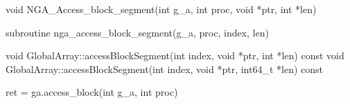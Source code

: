 \documentclass[10pt]{article}
\begin{document}

\begin{capi}
\begin{ccode}
void NGA_Access_block_segment(int g_a, int proc, void *ptr, int *len)
\end{ccode}
\begin{funcargs}
\end{funcargs}
\end{capi}

\begin{fapi}
\begin{fcode}
subroutine nga_access_block_segment(g_a, proc, index, len)
\end{fcode}
\begin{funcargs}
\end{funcargs}
\end{fapi}

\begin{cxxapi}
\begin{cxxcode}
void GlobalArray::accessBlockSegment(int index, void *ptr,
                                     int *len) const
void GlobalArray::accessBlockSegment(int index, void *ptr,
                                     int64_t *len) const
\end{cxxcode}
\begin{funcargs}
\end{funcargs}
\end{cxxapi}

\begin{pyapi}
\begin{pycode}
ret = ga.access_block(int g_a, int proc)
\end{pycode}
\begin{funcargs}
\end{funcargs}
\end{pyapi}

\local
\end{document}

